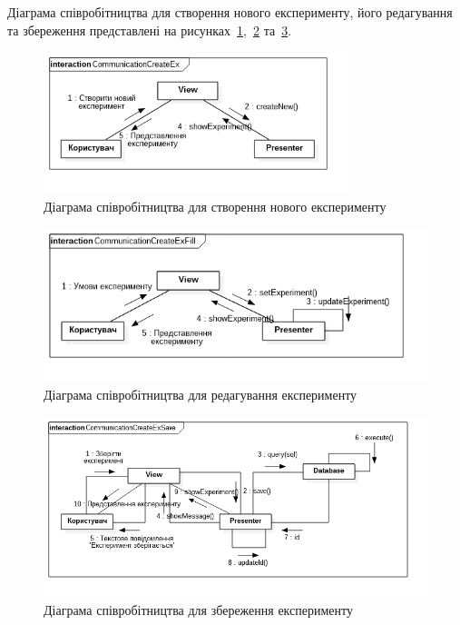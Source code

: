 Діаграма співробітництва для створення нового експерименту, його редагування та збереження представлені на рисунках~\ref{fig:uml_communication_experiment_create},~\ref{fig:uml_communication_experiment_edit} та~\ref{fig:uml_communication_experiment_save}.

\begin{figure}[H]
  \centering
    \includegraphics[width=0.8\textwidth]{uml_communication_experiment_create}
  \caption{Діаграма співробітництва для створення нового експерименту}
  \label{fig:uml_communication_experiment_create}
\end{figure}

\begin{figure}[H]
  \centering
    \includegraphics[width=1\textwidth]{uml_communication_experiment_edit}
  \caption{Діаграма співробітництва для редагування експерименту}
  \label{fig:uml_communication_experiment_edit}
\end{figure}

\begin{figure}[H]
  \centering
    \includegraphics[width=1\textwidth]{uml_communication_experiment_save}
  \caption{Діаграма співробітництва для збереження експерименту}
  \label{fig:uml_communication_experiment_save}
\end{figure}

